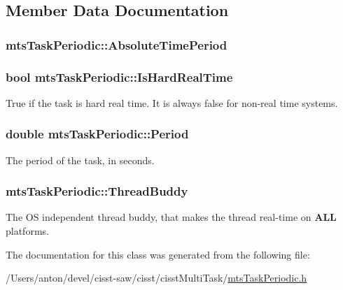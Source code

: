 \subsection{Member Data Documentation}
\hypertarget{classmts_task_periodic_a1e5e04be2039534dd19d645be4e7da60}{}
\subsubsection[{Absolute\+Time\+Period}]{ mts\+Task\+Periodic\+::\+Absolute\+Time\+Period\hspace{0.3cm}{\ttfamily [protected]}}\label{classmts_task_periodic_a1e5e04be2039534dd19d645be4e7da60}
\hypertarget{classmts_task_periodic_a84c05c06ebc6938d0c7ee007ea41a470}{}
\subsubsection[{Is\+Hard\+Real\+Time}]{\setlength{\rightskip}{0pt plus 5cm}bool mts\+Task\+Periodic\+::\+Is\+Hard\+Real\+Time\hspace{0.3cm}{\ttfamily [protected]}}\label{classmts_task_periodic_a84c05c06ebc6938d0c7ee007ea41a470}
True if the task is hard real time. It is always false for non-\/real time systems. \hypertarget{classmts_task_periodic_a8453eaab96a98c048192d7511f263988}{}
\subsubsection[{Period}]{\setlength{\rightskip}{0pt plus 5cm}double mts\+Task\+Periodic\+::\+Period\hspace{0.3cm}{\ttfamily [protected]}}\label{classmts_task_periodic_a8453eaab96a98c048192d7511f263988}
The period of the task, in seconds. \hypertarget{classmts_task_periodic_a8658fffa3b56f91a7853c20bd622c069}{}
\subsubsection[{Thread\+Buddy}]{ mts\+Task\+Periodic\+::\+Thread\+Buddy\hspace{0.3cm}{\ttfamily [protected]}}\label{classmts_task_periodic_a8658fffa3b56f91a7853c20bd622c069}
The O\+S independent thread buddy, that makes the thread real-\/time on {\bfseries A\+L\+L} platforms. 

The documentation for this class was generated from the following file\+:\begin{DoxyCompactItemize}
\item 
/\+Users/anton/devel/cisst-\/saw/cisst/cisst\+Multi\+Task/\hyperlink{mts_task_periodic_8h}{mts\+Task\+Periodic.\+h}\end{DoxyCompactItemize}
